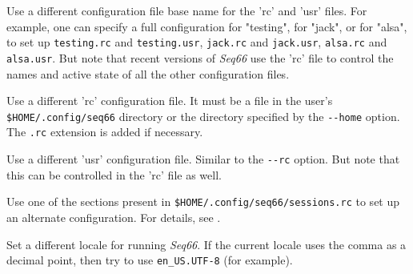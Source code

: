       Use a different configuration file base name for the 'rc' and 'usr'
      files.  For example, one can specify a full configuration for "testing",
      for "jack", or for "alsa", to set up
      \texttt{testing.rc} and \texttt{testing.usr},
      \texttt{jack.rc} and \texttt{jack.usr},
      \texttt{alsa.rc} and \texttt{alsa.usr}.
      But note that recent versions of \textsl{Seq66} use the 'rc' file
      to control the names and active state of all the other configuration
      files.

      Use a different 'rc' configuration file.
      It must be a file in the user's \texttt{\$HOME/.config/seq66}
      directory or the directory specified by the \texttt{-{}-home} option.
      The \texttt{.rc} extension is added if necessary.

      Use a different 'usr' configuration file.  Similar to the \texttt{-{}-rc}
      option. But note that this can be controlled in the 'rc' file as
      well.

      Use one of the sections present in
      \texttt{\$HOME/.config/seq66/sessions.rc}
      to set up an alternate configuration.
      For details, see .

      Set a different locale for running \textsl{Seq66}.
      If the current locale uses the comma as a decimal point,
      then try to use \texttt{en\_US.UTF-8} (for example).

